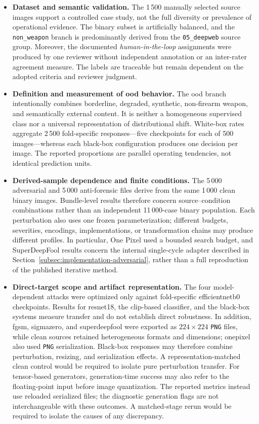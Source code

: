 \begin{itemize}

\item \textbf{Dataset and semantic validation.}
The 1\,500 manually selected source images support a controlled case study, not
the full diversity or prevalence of operational evidence. The binary subset is
artificially balanced, and the \texttt{non\_weapon} branch is predominantly
derived from the \texttt{05\_deepweb} source group. Moreover, the documented
\textit{human-in-the-loop} assignments were produced by one reviewer without
independent annotation or an inter-rater agreement measure. The labels are
traceable but remain dependent on the adopted criteria and reviewer judgment.

\item \textbf{Definition and measurement of \gls{ood} behavior.}
The \gls{ood} branch intentionally combines borderline, degraded, synthetic,
non-firearm weapon, and semantically external content. It is neither a
homogeneous supervised class nor a universal representation of distributional
shift. White-box rates aggregate 2\,500 fold-specific responses---five checkpoints
for each of 500 images---whereas each black-box configuration produces one
decision per image. The reported proportions are parallel operating tendencies,
not identical prediction units.

\item \textbf{Derived-sample dependence and finite conditions.}
The 5\,000 adversarial and 5\,000 anti-forensic files derive from the same
1\,000 clean binary images. Bundle-level results therefore concern
source--condition combinations rather than an independent 11\,000-case binary
population. Each perturbation also uses one frozen parameterization; different
budgets, severities, encodings, implementations, or transformation chains may
produce different profiles. In particular, One Pixel used a bounded search
budget, and SuperDeepFool results concern the internal single-cycle adapter
described in Section~\ref{subsec:implementation-adversarial}, rather than a
full reproduction of the published iterative method.

\item \textbf{Direct-target scope and artifact representation.}
The four model-dependent attacks were optimized only against fold-specific
\gls{efficientnetb0} checkpoints. Results for \gls{resnet18}, the
\gls{clip}-based classifier, and the black-box systems measure transfer and do not
establish direct robustness. In addition, \gls{fgsm}, \gls{sigmazero}, and
\gls{superdeepfool} were exported as \(224 \times 224\) \texttt{PNG} files,
while clean sources retained heterogeneous formats and dimensions;
\gls{onepixel} also used \texttt{PNG} serialization. Black-box responses may
therefore combine perturbation, resizing, and serialization effects.
A representation-matched clean control would be required to isolate pure
perturbation transfer.
For tensor-based generators, generation-time success may also refer to the
floating-point input before image quantization. The reported metrics instead
use reloaded serialized files; the diagnostic generation flags are not
interchangeable with these outcomes. A matched-stage rerun would be required
to isolate the causes of any discrepancy.


\end{itemize}
